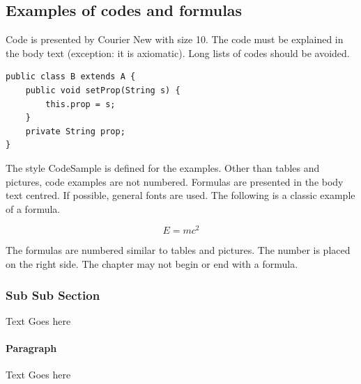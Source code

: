 \documentclass[a4paper,12pt]{article}
\begin{document}
\subsection{Examples of codes and formulas}
Code is presented by Courier New with size 10. The code must be explained in the body text (exception: it is axiomatic). Long lists of codes should be avoided.

\begin{verbatim}
public class B extends A {	
    public void setProp(String s) {
        this.prop = s;
    }
    private String prop;
}
\end{verbatim}

The style CodeSample is defined for the examples. Other than tables and pictures, code examples are not numbered.
Formulas are presented in the body text centred. If possible, general fonts are used. The following is a classic example of a formula.

\begin{equation}
    E = mc^2
\end{equation}

The formulas are numbered similar to tables and pictures. The number is placed on the right side. The chapter may not begin or end with a formula.
\subsubsection{Sub Sub Section}
Text Goes here

\paragraph{Paragraph}
Text Goes here

\newpage

\printbibliography[heading=bibintoc] %
\nocite{*}
\end{document}
